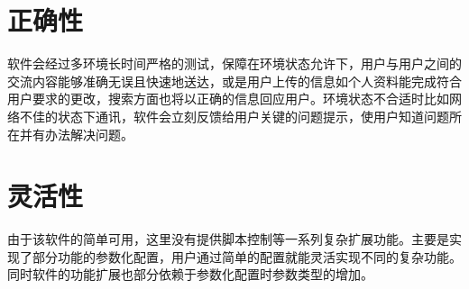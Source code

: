 \section{正确性}
软件会经过多环境长时间严格的测试，保障在环境状态允许下，用户与用户之间的交流内容能够准确无误且快速地送达，或是用户上传的信息如个人资料能完成符合用户要求的更改，搜索方面也将以正确的信息回应用户。环境状态不合适时比如网络不佳的状态下通讯，软件会立刻反馈给用户关键的问题提示，使用户知道问题所在并有办法解决问题。

\section{灵活性}
由于该软件的简单可用，这里没有提供脚本控制等一系列复杂扩展功能。主要是实现了部分功能的参数化配置，用户通过简单的配置就能灵活实现不同的复杂功能。同时软件的功能扩展也部分依赖于参数化配置时参数类型的增加。







